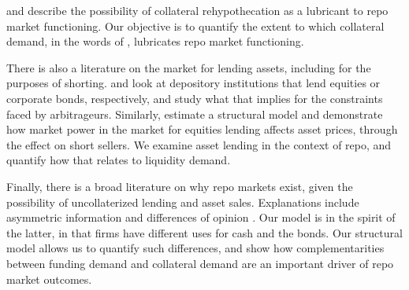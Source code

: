  \cite{singh2011velocity} and \cite{aitken2010sizable} describe the possibility of collateral rehypothecation as a lubricant to repo market functioning. Our objective is to quantify the extent to which collateral demand, in the words of \cite{singh2011velocity}, lubricates repo market functioning. 



There is also a literature on the market for lending assets, including for the purposes of shorting. \cite{d2002market} and \cite{asquith2013market} look at depository institutions that lend equities or corporate bonds, respectively, and study what that implies for the constraints faced by arbitrageurs. Similarly, \cite{chen2022market} estimate a structural model and demonstrate how market power in the market for equities lending affects asset prices, through the effect on short sellers. We examine asset lending in the context of repo, and quantify how that relates to liquidity demand.


Finally, there is a broad literature on why repo markets exist, given the possibility of uncollaterized lending and asset sales. Explanations include asymmetric information \cite{bigio2015endogenous} and differences of opinion \cite{geanakoplos2010leverage}. Our model is in the spirit of the latter, in that firms have different uses for cash and the bonds. Our structural model allows us to quantify such differences, and show how complementarities between funding demand and collateral demand are an important driver of repo market outcomes.







